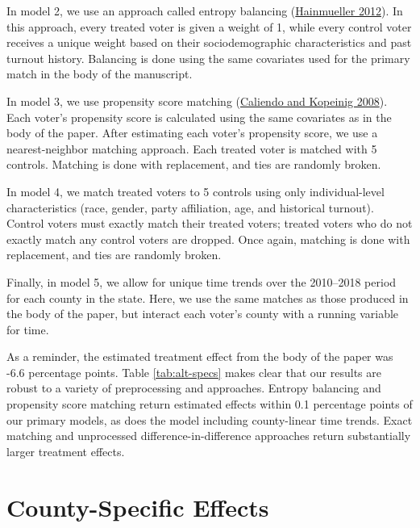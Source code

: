 \documentclass[
  12pt,
]{article}
\begin{document}
In model 2, we use an approach called entropy balancing (\protect\hyperlink{ref-Hainmueller2012}{Hainmueller 2012}). In this approach, every treated voter is given a weight of 1, while every control voter receives a unique weight based on their sociodemographic characteristics and past turnout history. Balancing is done using the same covariates used for the primary match in the body of the manuscript.

In model 3, we use propensity score matching (\protect\hyperlink{ref-Caliendo2008}{Caliendo and Kopeinig 2008}). Each voter's propensity score is calculated using the same covariates as in the body of the paper. After estimating each voter's propensity score, we use a nearest-neighbor matching approach. Each treated voter is matched with 5 controls. Matching is done with replacement, and ties are randomly broken.

In model 4, we match treated voters to 5 controls using only individual-level characteristics (race, gender, party affiliation, age, and historical turnout). Control voters must exactly match their treated voters; treated voters who do not exactly match any control voters are dropped. Once again, matching is done with replacement, and ties are randomly broken.

Finally, in model 5, we allow for unique time trends over the 2010--2018 period for each county in the state. Here, we use the same matches as those produced in the body of the paper, but interact each voter's county with a running variable for time.

As a reminder, the estimated treatment effect from the body of the paper was -6.6 percentage points. Table \ref{tab:alt-specs} makes clear that our results are robust to a variety of preprocessing and approaches. Entropy balancing and propensity score matching return estimated effects within 0.1 percentage points of our primary models, as does the model including county-linear time trends. Exact matching and unprocessed difference-in-difference approaches return substantially larger treatment effects.

\begin{singlespace}

\end{singlespace}

\hypertarget{county-specific-effects}{%
\section*{County-Specific Effects}\label{county-specific-effects}}
\end{document}
